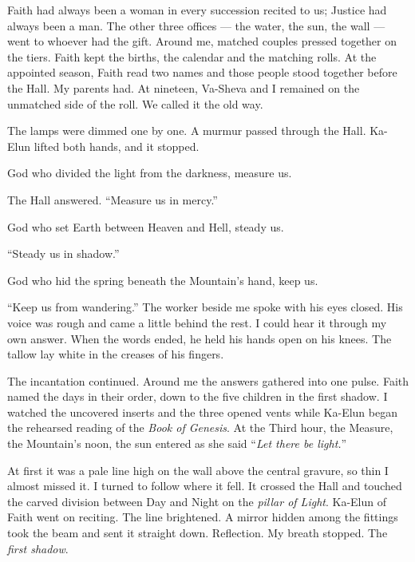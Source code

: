 Faith had always been a woman in every succession recited to us; Justice had always been a man. The other three offices --- the water, the sun, the wall --- went to whoever had the gift. Around me, matched couples pressed together on the tiers. Faith kept the births, the calendar and the matching rolls. At the appointed season, Faith read two names and those people stood together before the Hall. My parents had. At nineteen, Va-Sheva and I remained on the unmatched side of the roll. We called it the old way.\par

The lamps were dimmed one by one. A murmur passed through the Hall. Ka-Elun lifted both hands, and it stopped. \par

\begin{scripture}
God who divided the light from the darkness, measure us.
\end{scripture}

The Hall answered. ``Measure us in mercy.''\par

\begin{scripture}
God who set Earth between Heaven and Hell, steady us.
\end{scripture}

``Steady us in shadow.''\par

\begin{scripture}
God who hid the spring beneath the Mountain's hand, keep us.
\end{scripture}

``Keep us from wandering.'' The worker beside me spoke with his eyes closed. His voice was rough and came a little behind the rest. I could hear it through my own answer. When the words ended, he held his hands open on his knees. The tallow lay white in the creases of his fingers.\par

The incantation continued. Around me the answers gathered into one pulse. Faith named the days in their order, down to the five children in the first shadow. I watched the uncovered inserts and the three opened vents while Ka-Elun began the rehearsed reading of the \textit{Book of Genesis}. At the Third hour, the Measure, the Mountain's noon, the sun entered as she said ``\textit{Let there be light.}'' \par

At first it was a pale line high on the wall above the central gravure, so thin I almost missed it. I turned to follow where it fell. It crossed the Hall and touched the carved division between Day and Night on the \textit{pillar of Light}. Ka-Elun of Faith went on reciting. The line brightened. A mirror hidden among the fittings took the beam and sent it straight down. Reflection. My breath stopped. The \textit{first shadow}.\par

